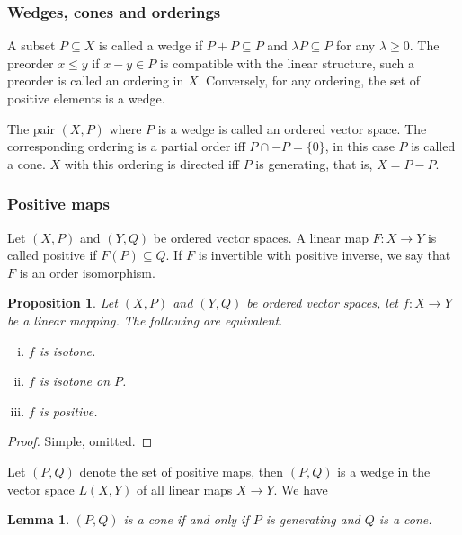 \documentclass[12pt]{article}
\newtheorem{lemma}{Lemma}
\newtheorem{prop}{Proposition}
\theoremstyle{remark}
\newcommand{\<}{\langle}
\begin{document}

\subsubsection*{Wedges, cones and orderings}

A subset $P\subseteq X$ is called a  wedge if $P+P\subseteq P$ and $\lambda P\subseteq P$ for any $\lambda\ge 0$. The preorder $x\le y$ if $x-y\in P$ is compatible with the linear structure, such a preorder is called an ordering in $X$. Conversely, for any ordering, the set of positive elements  is a wedge.

The pair $(X,P)$ where $P$ is a wedge is called an ordered vector space. 
The corresponding ordering is a partial order iff $P\cap -P=\{0\}$, in this case $P$ is called a cone. 
$X$ with this ordering is directed  iff $P$ is generating, that is,  $X=P-P$. 

\subsubsection*{Positive maps}

Let $(X,P)$ and $(Y,Q)$ be ordered vector spaces. A  linear map $F:X\to Y$ is called positive if $F(P)\subseteq Q$. If $F$ is invertible with positive inverse, we say that $F$ is an order isomorphism.

\begin{prop}
Let $(X,P)$ and $(Y,Q)$ be ordered vector spaces, let $f\colon X\to Y$ be a linear mapping.
The following are equivalent.
\begin{enumerate}[(i)]
\item $f$ is isotone.
\item $f$ is isotone on $P$.
\item $f$ is positive.
\end{enumerate}
\end{prop}
\begin{proof}
Simple, omitted.
\end{proof}


 Let  $(P,Q)$ denote the set of positive maps, then $(P,Q)$ is a wedge in the vector space $L(X,Y)$ of all linear maps $X\to Y$. We have

\begin{lemma}\label{lemma:duality_morph} $(P,Q)$ is a cone if and only if $P$ is generating and $Q$ is a cone.

\end{lemma}
\end{document}
